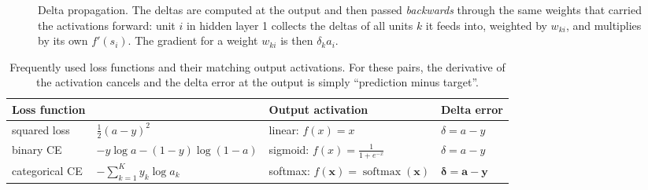 \documentclass[11pt, oneside]{book}
\newcommand{\loss}{\mathcal{L}}          %
\newcommand{\params}{\boldsymbol{\theta}}   %
\DeclareMathOperator{\softmax}{softmax}
\newcommand{\bx}{\bm{x}}        \newcommand{\by}{\bm{y}}
\newcommand{\ba}{\bm{a}}        \newcommand{\bs}{\bm{s}}
\newcommand{\bdelta}{\bm{\delta}}
\begin{document}
\begin{figure}[htbp]
\centering
{}
\caption{Delta propagation. The deltas are computed at the output and then
passed \emph{backwards} through the same weights that carried the
activations forward: unit $i$ in hidden layer 1 collects the deltas of all
units $k$ it feeds into, weighted by $w_{ki}$, and multiplies by its own
$f'(s_i)$. The gradient for a weight $w_{ki}$ is then $\delta_k a_i$.}
\label{fig:delta-propagation}
\end{figure}

\begin{table}[htbp]
\centering
\small
\renewcommand{\arraystretch}{1.25}
\begin{tabular}{@{}llll@{}}
\toprule
\textbf{Loss function} & & \textbf{Output activation} & \textbf{Delta error} \\
\midrule
squared loss & $\tfrac12(a - y)^2$ & linear: $f(x) = x$ & $\delta = a - y$ \\
binary CE & $-y\log a - (1-y)\log(1-a)$ & sigmoid: $f(x) = \frac{1}{1+e^{-x}}$ & $\delta = a - y$ \\
categorical CE & $-\sum_{k=1}^K y_k\log a_k$ & softmax: $f(\bx) = \softmax(\bx)$ & $\bdelta = \ba - \by$ \\
\bottomrule
\end{tabular}
\caption{Frequently used loss functions and their matching output
activations. For these pairs, the derivative of the activation cancels and
the delta error at the output is simply ``prediction minus target''.}
\label{tab:loss-activation}
\end{table}
\end{document}
